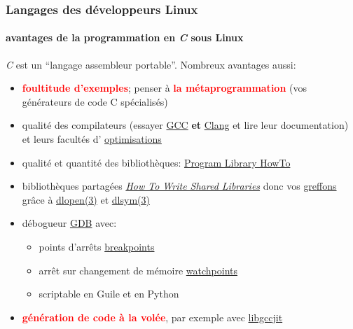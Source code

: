 \documentclass[xcolor=svgnames,final,smaller,a4]{beamer}
\begin{document}
\begin{frame}
  \frametitle{Langages des développeurs Linux}
  \framesubtitle{avantages de la programmation en \textit{C} sous Linux}

  \textit{C} est un ``langage assembleur portable''. Nombreux avantages aussi:

  \begin{itemize}

  \item  \textcolor{red}{\textbf{foultitude d'exemples}}; penser à \textcolor{red}{\textbf{la métaprogrammation}} (vos générateurs de code C spécialisés)
    
  \item qualité des compilateurs (essayer
    \href{http://gcc.gnu.org/}{GCC} \textbf{et}
    \href{https://clang.llvm.org}{Clang} et lire leur documentation)
    et leurs facultés d'
    \href{https://en.wikipedia.org/wiki/Optimizing_compiler}{optimisations}

  \item qualité et quantité des bibliothèques: \href{https://tldp.org/HOWTO/Program-Library-HOWTO/}{Program Library HowTo}

  \item bibliothèques partagées
    \href{https://www.akkadia.org/drepper/dsohowto.pdf}{\textit{How To
        Write Shared Libraries}} donc vos
    \href{https://fr.wikipedia.org/wiki/Plugin}{greffons} grâce à
    \href{https://www.man7.org/linux/man-pages/man3/dlopen.3.html}{dlopen(3)}
    et
    \href{https://www.man7.org/linux/man-pages/man3/dlsym.3.html}{dlsym(3)}

  \item débogueur \href{https://www.gnu.org/software/gdb/}{GDB} avec:
    \begin{itemize}
    \item points d'arrêts \href{https://sourceware.org/gdb/current/onlinedocs/gdb/Breakpoints.html}{breakpoints}
    \item arrêt sur changement de mémoire \href{https://sourceware.org/gdb/current/onlinedocs/gdb/Set-Watchpoints.html}{watchpoints}
    \item scriptable en Guile et en Python
    \end{itemize}

  \item  \textcolor{red}{\textbf{génération de code à la volée}}, par exemple avec \href{https://gcc.gnu.org/onlinedocs/jit/}{libgccjit}
  \end{itemize}
\end{frame}
\end{document}
